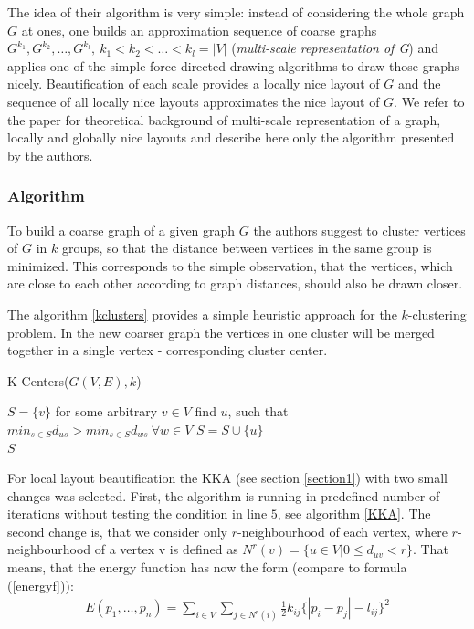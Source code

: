 \documentclass[12pt,a4paper]{article}
\begin{document}
The idea of their algorithm is very simple: instead of considering the whole graph $G$ at ones, one builds an approximation sequence of coarse graphs $G^{k_1}, G^{k_2}, \dots, G^{k_l},\ k_1<k_2<\dots<k_l=|V|$ ({\it multi-scale representation of G}) and applies one of the simple force-directed drawing algorithms to draw those graphs nicely. Beautification of each scale provides a locally nice layout of $G$ and the sequence of all locally nice layouts approximates the nice layout of $G$. We refer to the paper \cite{DavidHarel2002} for theoretical background of multi-scale representation of a graph, locally and globally nice layouts and describe here only the algorithm presented by the authors.

\subsubsection*{Algorithm}
To build a coarse graph of a given graph $G$ the authors suggest to cluster vertices of $G$ in $k$ groups, so that the distance between vertices in the same group is minimized. This corresponds to the simple observation, that the vertices, which are close to each other according to graph distances, should also be drawn closer.

The algorithm \ref{kclusters} provides a simple heuristic approach for the $k$-clustering problem. In the new coarser graph the vertices in one cluster will be merged together in a single vertex - corresponding cluster center.

\begin{algorithm}
\caption{K-Centers($G(V,E),k$) \cite{DavidHarel2002}}
\label{kclusters}
\begin{algorithmic}[1]
\State $S=\{v\}$ for some arbitrary $v\in V$
	\State find $u$, such that $min_{s\in S}d_{us}>min_{s\in S} d_{ws}\ \forall w\in V$ 
	\State $S = S\cup\{u\}$
\EndFor \\
\Return $S$
\end{algorithmic}
\end{algorithm}

For local layout beautification the KKA (see section \ref{section1}) with two small changes was selected. First, the algorithm is running in predefined number of iterations without testing the condition in line $5$, see algorithm \ref{KKA}. The second change is, that we consider only $r$-neighbourhood of each vertex, where $r$-neighbourhood of a vertex v is defined as $N^r(v)=\{u\in V| 0\le d_{uv}<r\}$. That means, that the energy function has now the form (compare to formula (\ref{energyf})):
\begin{align}
\label{energyf_HK}
E(p_1 , \dots, p_n) = \sum_{i\in V} \sum_{j\in N^r(i)} \frac{1}{2} k_{ij} \lbrace | p_i - p_j | - l_{ij} \rbrace^2
\end{align}
\end{document}
